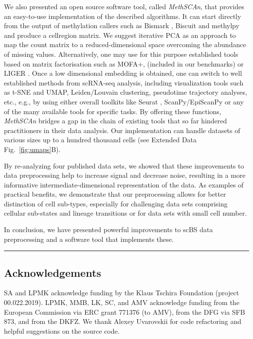 \documentclass[10pt]{article}
\begin{document}
We also presented an open source software tool, called \textit{MethSCAn}, that provides an easy-to-use implementation of the described algorithms.
It can start directly from the output of methylation callers such as Bismark \citep{bismark}, Biscuit \citep{biscuit} and methylpy \citep{methylpy} and produce a cell\texttimes region matrix.
We suggest iterative PCA as an approach to map the count matrix to a reduced-dimensional space overcoming the abundance of missing values.
Alternatively, one may use for this purpose established tools based on matrix factorisation such as MOFA+, \citep{argelaguet2020mofa} (included in our benchmarks) or LIGER \citep{welch2019single}.
Once a low dimensional embedding is obtained, one can switch to well established methods from scRNA-seq analysis, including visualization tools such as t-SNE and UMAP, Leiden/Louvain clustering, pseudotime trajectory analyses, etc., e.g., by using either overall toolkits like Seurat \citep{seurat5}, ScanPy/EpiScanPy \citep{Wolf_2018,danese2021episcanpy} or any of the many available tools for specific tasks.
By offering these functions, \textit{MethSCAn} bridges a gap in the chain of existing tools that so far hindered practitioners in their data analysis.
Our implementation can handle datasets of various sizes up to a hundred thousand cells (see Extended Data Fig.~\ref{fig:umaps}B).

By re-analyzing four published data sets, we showed that these improvements to data preprocessing help to increase signal and decrease noise, resulting in a more informative intermediate-dimensional representation of the data.
As examples of practical benefits, we demonstrate that our preprocessing allows for better distinction of cell sub-types, especially for challenging data sets comprising cellular sub-states and lineage transitions or for data sets with small cell number.

In conclusion, we have presented powerful improvements to scBS data preprocessing and a software tool that implements these.

\vspace{1.4ex}
\noindent\hfil\rule{.6\columnwidth}{.2pt}\hfil


\subsection*{Acknowledgements}
SA and LPMK acknowledge funding by the Klaus Tschira Foundation (project 00.022.2019).
LPMK, MMB, LK, SC, and AMV acknowledge funding from the European Commission via ERC grant 771376 (to AMV), from the DFG via SFB 873, and from the DKFZ.
We thank Alexey Uvarovskii for code refactoring and helpful suggestions on the source code.
\end{document}
